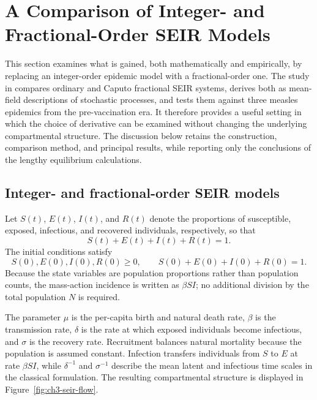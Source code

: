 \documentclass[00-main.tex]{subfiles}
\begin{document}
\section{A Comparison of Integer- and Fractional-Order SEIR Models}

This section examines what is gained, both mathematically and empirically, by replacing an integer-order epidemic model with a fractional-order one.
The study in \cite{Is20} compares ordinary and Caputo fractional SEIR systems, derives both as mean-field descriptions of stochastic processes, and tests them against three measles epidemics from the pre-vaccination era.
It therefore provides a useful setting in which the choice of derivative can be examined without changing the underlying compartmental structure.
The discussion below retains the construction, comparison method, and principal results, while reporting only the conclusions of the lengthy equilibrium calculations.


\subsection{Integer- and fractional-order SEIR models}

Let $S(t)$, $E(t)$, $I(t)$, and $R(t)$ denote the proportions of susceptible, exposed, infectious, and recovered individuals, respectively, so that
\[
S(t)+E(t)+I(t)+R(t)=1.
\]
The initial conditions satisfy
\[
S(0),E(0),I(0),R(0)\geq0,
\qquad
S(0)+E(0)+I(0)+R(0)=1.
\]
Because the state variables are population proportions rather than population counts, the mass-action incidence is written as $\beta SI$; no additional division by the total population $N$ is required.

The parameter $\mu$ is the per-capita birth and natural death rate, $\beta$ is the transmission rate, $\delta$ is the rate at which exposed individuals become infectious, and $\sigma$ is the recovery rate.
Recruitment balances natural mortality because the population is assumed constant.
Infection transfers individuals from $S$ to $E$ at rate $\beta SI$, while $\delta^{-1}$ and $\sigma^{-1}$ describe the mean latent and infectious time scales in the classical formulation.
The resulting compartmental structure is displayed in Figure~\ref{fig:ch3-seir-flow}.
\end{document}

